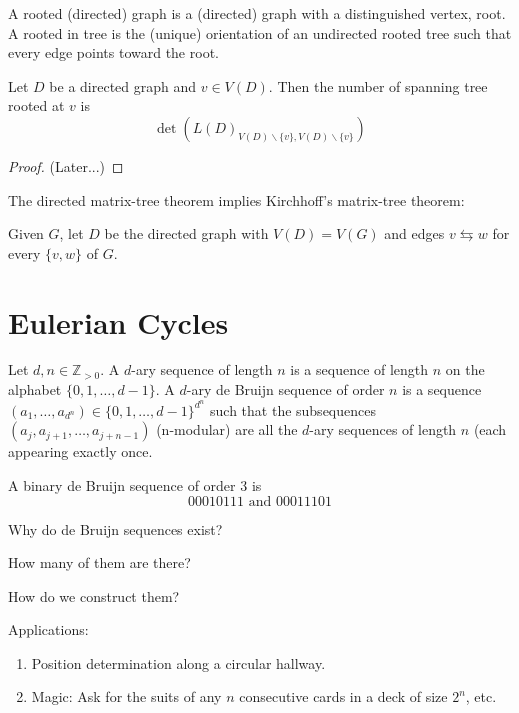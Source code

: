 \begin{definition}
A rooted (directed) graph is a (directed) graph with a distinguished vertex, root. A rooted in tree is the (unique) orientation of an undirected rooted tree such that every edge points toward the root.
\end{definition}

\begin{theorem}
Let $D$ be a directed graph and $v\in V(D)$. Then the number of spanning tree rooted at $v$ is
$$\det(L(D)_{V(D)\backslash \{v\},V(D)\backslash \{v\}})$$
\end{theorem}
\begin{proof}
(Later...)
\end{proof}

\begin{remark}
The directed matrix-tree theorem implies Kirchhoff's matrix-tree theorem:

Given $G$, let $D$ be the directed graph with $V(D)=V(G)$ and edges $v\leftrightarrows w$ for every $\{v,w\}$ of $G$.
\end{remark}

\section{Eulerian Cycles}
\begin{definition}
Let $d,n\in\mathbb{Z}_{>0}$. A $d$-ary sequence of length $n$ is a sequence of length $n$ on the alphabet $\{0,1,\ldots,d-1\}$. A $d$-ary de Bruijn sequence of order $n$ is a sequence $(a_1,\ldots,a_{d^n})\in\{0,1,\ldots,d-1\}^{d^n}$ such that the subsequences $(a_j,a_{j+1},\ldots,a_{j+n-1})$ (n-modular) are all the $d$-ary sequences of length $n$ (each appearing exactly once.
\end{definition}

\begin{example}
A binary de Bruijn sequence of order 3 is 
\[
00010111 \textrm{ and } 00011101
\]
\end{example}

Why do de Bruijn sequences exist?

How many of them are there?

How do we construct them?

Applications:
\begin{enumerate}
\item Position determination along a circular hallway.
\item Magic: Ask for the suits of any $n$ consecutive cards in a deck of size $2^n$, etc.
\end{enumerate}


